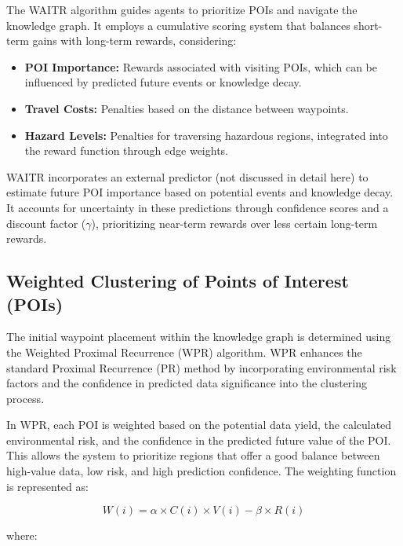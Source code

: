 \documentclass[conference]{IEEEtran}
\begin{document}
The WAITR algorithm guides agents to prioritize POIs and navigate the knowledge graph. It employs a cumulative scoring system that balances short-term gains with long-term rewards, considering:

\begin{itemize}
    \item \textbf{POI Importance:}  Rewards associated with visiting POIs, which can be influenced by predicted future events or knowledge decay.
    \item \textbf{Travel Costs:}  Penalties based on the distance between waypoints.
    \item \textbf{Hazard Levels:}  Penalties for traversing hazardous regions, integrated into the reward function through edge weights.
\end{itemize}

WAITR incorporates an external predictor (not discussed in detail here) to estimate future POI importance based on potential events and knowledge decay. It accounts for uncertainty in these predictions through confidence scores and a discount factor (\(\gamma\)), prioritizing near-term rewards over less certain long-term rewards.



\subsection{Weighted Clustering of Points of Interest (POIs)}

The initial waypoint placement within the knowledge graph is determined using the Weighted Proximal Recurrence (WPR) algorithm. WPR enhances the standard Proximal Recurrence (PR) method \cite{holmberg2023stroobnet} by incorporating environmental risk factors and the confidence in predicted data significance into the clustering process.  

In WPR, each POI is weighted based on the potential data yield, the calculated environmental risk, and the confidence in the predicted future value of the POI. This allows the system to prioritize regions that offer a good balance between high-value data, low risk, and high prediction confidence. The weighting function is represented as:

\[
W(i) = \alpha \times C(i) \times V(i) - \beta \times R(i)
\]

where:
\end{document}
